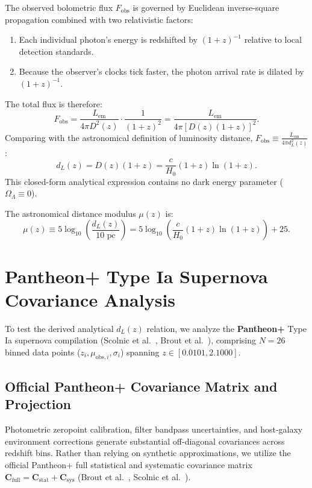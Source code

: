\documentclass[11pt,a4paper]{article}
\begin{document}
The observed bolometric flux $F_{\mathrm{obs}}$ is governed by Euclidean inverse-square propagation combined with two relativistic factors:
\begin{enumerate}
    \item Each individual photon's energy is redshifted by $(1+z)^{-1}$ relative to local detection standards.
    \item Because the observer's clocks tick faster, the photon arrival rate is dilated by $(1+z)^{-1}$.
\end{enumerate}
The total flux is therefore:
\begin{equation}
    F_{\mathrm{obs}} = \frac{L_{\mathrm{em}}}{4\pi D^2(z)} \cdot \frac{1}{(1+z)^2} = \frac{L_{\mathrm{em}}}{4\pi \left[ D(z) (1+z) \right]^2}.
    \label{eq:flux_formula}
\end{equation}
Comparing with the astronomical definition of luminosity distance, $F_{\mathrm{obs}} \equiv \frac{L_{\mathrm{em}}}{4\pi d_L^2(z)}$:
\begin{equation}
    \boxed{ d_L(z) = D(z) (1 + z) = \frac{c}{H_0} (1 + z) \ln(1 + z). }
    \label{eq:dl_main_formula}
\end{equation}
This closed-form analytical expression contains no dark energy parameter ($\Omega_\Lambda \equiv 0$).

The astronomical distance modulus $\mu(z)$ is:
\begin{equation}
    \mu(z) \equiv 5 \log_{10}\left( \frac{d_L(z)}{10\text{ pc}} \right) = 5 \log_{10}\left( \frac{c}{H_0} (1+z) \ln(1+z) \right) + 25.
    \label{eq:distance_modulus_formula}
\end{equation}

\section{Pantheon+ Type Ia Supernova Covariance Analysis}
\label{sec:pantheon_analysis}

To test the derived analytical $d_L(z)$ relation, we analyze the \textbf{Pantheon+} Type Ia supernova compilation (Scolnic et al.~\cite{pantheon_scolnic}, Brout et al.~\cite{pantheon_brout}), comprising $N=26$ binned data points ($z_i, \mu_{\mathrm{obs},i}, \sigma_i$) spanning $z \in [0.0101, 2.1000]$.

\subsection{Official Pantheon+ Covariance Matrix and Projection}
Photometric zeropoint calibration, filter bandpass uncertainties, and host-galaxy environment corrections generate substantial off-diagonal covariances across redshift bins. Rather than relying on synthetic approximations, we utilize the official Pantheon+ full statistical and systematic covariance matrix $\mathbf{C}_{\mathrm{full}} = \mathbf{C}_{\mathrm{stat}} + \mathbf{C}_{\mathrm{sys}}$ (Brout et al.~\cite{pantheon_brout}, Scolnic et al.~\cite{pantheon_scolnic}).
\end{document}
